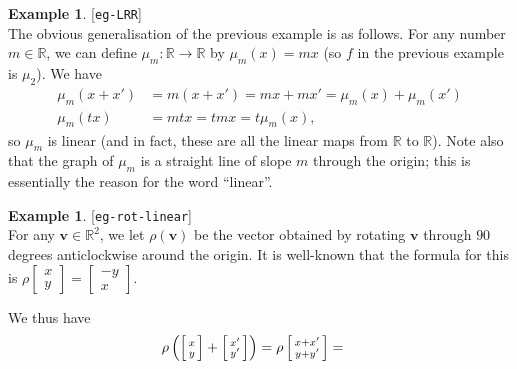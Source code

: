 \documentclass{amsart}
\newcommand{\lbl}[1]{\label{#1}\textup{[\texttt{#1}]}\ \\}
\newcommand{\lbl}{\label}
\newcommand{\R}         {{\mathbb{R}}}
\newcommand{\bsm}       {\left[\begin{smallmatrix}}
\newcommand{\esm}       {\end{smallmatrix}\right]}
\newcommand{\xra}       {\xrightarrow}
\newcommand{\xx}        {x\vphantom{x'}}
\newcommand{\yy}        {y\vphantom{y'}}
\newcommand{\vv}        {\mathbf{v}}
\renewcommand{\:}       {\colon}
\theoremstyle{definition}
\newtheorem{example}[theorem]{Example}
\begin{document}
\begin{example}\lbl{eg-LRR}
 The obvious generalisation of the previous example is as
 follows.  For any number $m\in\R$, we can define
 $\mu_m\:\R\xra{}\R$ by $\mu_m(x)=mx$ (so $f$ in the
 previous example is $\mu_2$).  We have
 \begin{align*}
   \mu_m(x+x') &= m(x+x') = mx+mx' = \mu_m(x) + \mu_m(x') \\
   \mu_m(tx)   &= mtx = tmx = t\mu_m(x),
 \end{align*}
 so $\mu_m$ is linear (and in fact, these are all the linear
 maps from $\R$ to $\R$).  Note also that the graph of
 $\mu_m$ is a straight line of slope $m$ through the origin;
 this is essentially the reason for the word ``linear''.
\end{example}

\begin{example}\lbl{eg-rot-linear}
 For any $\vv\in\R^2$, we let $\rho(\vv)$ be the vector obtained
 by rotating $\vv$ through $90$ degrees anticlockwise around
 the origin.  It is well-known that the formula for this is
 $\rho\bsm x\\ y\esm=\bsm -y\\ x\esm$.
 \begin{center}
 \end{center}
 We thus have
 \begin{align*}
  \rho\left(\bsm \xx\\\yy\esm+\bsm x'\\ y'\esm\right) &=
   \rho\bsm \xx+x'\\ \yy+y'\esm =

\end{align*}
\end{example}
\end{document}
